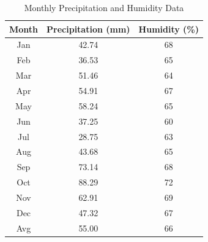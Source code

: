 \documentclass[conference]{IEEEtran}
\begin{document}
\begin{table}[htbp]
\caption{Monthly Precipitation and Humidity Data}
\begin{center}
\begin{tabular}{|c|c|c|}
\hline
\textbf{Month} & \textbf{Precipitation (mm)} & \textbf{Humidity (\%)} \\
\hline
Jan & 42.74 & 68 \\
\hline
Feb & 36.53 & 65 \\
\hline
Mar & 51.46 & 64 \\
\hline
Apr & 54.91 & 67 \\
\hline
May & 58.24 & 65 \\
\hline
Jun & 37.25 & 60 \\
\hline
Jul & 28.75 & 63 \\
\hline
Aug & 43.68 & 65 \\
\hline
Sep & 73.14 & 68 \\
\hline
Oct & 88.29 & 72 \\
\hline
Nov & 62.91 & 69 \\
\hline
Dec & 47.32 & 67 \\
\hline
Avg & 55.00 & 66 \\
\hline
\end{tabular}
\label{tab:monthly_precip_humidity}
\end{center}
\end{table}
\end{document}
